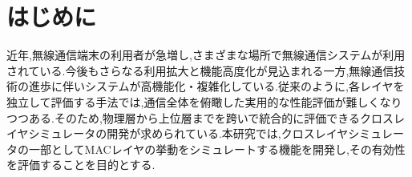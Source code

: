 \documentclass[a4paper, 10pt]{ltjsarticle}
\begin{document}
\setlength{\columnsep}{7.5mm}

\twocolumn[
    \begin{center}
        {\vspace{-1em}}

        {\fontsize{15pt}{15pt}\selectfont{クロスレイヤシミュレータにおける無線LAN評価モデルの検討}}

        {\vspace{1.3em}}

        {\fontsize{13pt}{13pt}\selectfont{A Study of a Wireless LAN Evaluation Model in a Cross-Layer Simulator}}
    \end{center}

    \vspace{0.1em}

    \begin{flushright}
      {\fontsize{11pt}{11pt}\selectfont{T5-16 \, 下沢亮太郎}}
      \\
      {\fontsize{11pt}{11pt}\selectfont{指導教員 \, 設樂勇}}
    \end{flushright}

    \vspace{1em}

    \thispagestyle{empty}
]

\section{はじめに}

近年,無線通信端末の利用者が急増し,さまざまな場所で無線通信システムが利用されている.今後もさらなる利用拡大と機能高度化が見込まれる一方,無線通信技術の進歩に伴いシステムが高機能化・複雑化している.従来のように,各レイヤを独立して評価する手法では,通信全体を俯瞰した実用的な性能評価が難しくなりつつある.そのため,物理層から上位層までを跨いで統合的に評価できるクロスレイヤシミュレータの開発が求められている.本研究では,クロスレイヤシミュレータの一部としてMACレイヤの挙動をシミュレートする機能を開発し,その有効性を評価することを目的とする.
\end{document}
